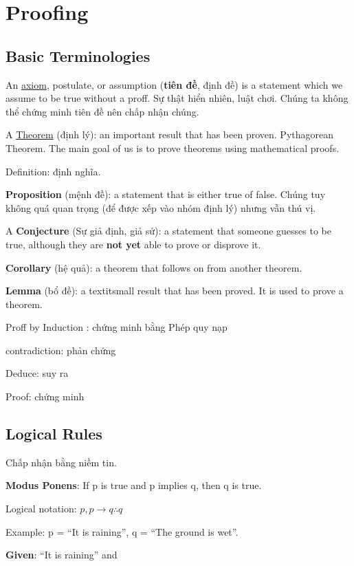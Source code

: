\chapter{Proofing}

\section{Basic Terminologies}

An \href{https://en.wikipedia.org/wiki/Axiom}{axiom}, postulate, or assumption (\textbf{tiên đề}, định đề) is a statement which we assume to be true without a proff. Sự thật hiển nhiên, luật chơi. Chúng ta không thể chứng minh tiên đề nên chấp nhận chúng.

A \href{https://en.wikipedia.org/wiki/Theorem}{Theorem} (định lý): an important result that has been proven. Pythagorean Theorem. The main goal of us is to prove theorems using mathematical proofs.

Definition: định nghĩa.

\textbf{Proposition} (mệnh đề): a statement that is either true of false. Chúng tuy không quá quan trọng (để được xếp vào nhóm định lý) nhưng vẫn thú vị.

A \textbf{Conjecture} (Sự giả định, giả sử): a statement that someone guesses to be true, although they are \textbf{not yet} able to prove or disprove it.

\textbf{Corollary} (hệ quả): a theorem that follows on from another theorem.

\textbf{Lemma} (bổ đề): a textit{small} result that has been proved. It is used to prove a theorem.

Proff by Induction : chứng minh bằng Phép quy nạp

contradiction: phản chứng

Deduce: suy ra

Proof: chứng minh

\section{Logical Rules}

Chấp nhận bằng niềm tin.

\noindent \textbf{Modus Ponens}: If p is true and p implies q, then q is true.

Logical notation: \(p,p \rightarrow q \therefore q\)

Example: p = ``It is raining'', q = ``The ground is wet''.

\textbf{Given}: ``It is raining'' and 

